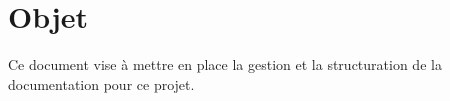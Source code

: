 \section{Objet}
Ce document vise à mettre en place la gestion et la structuration de la documentation pour ce projet.
